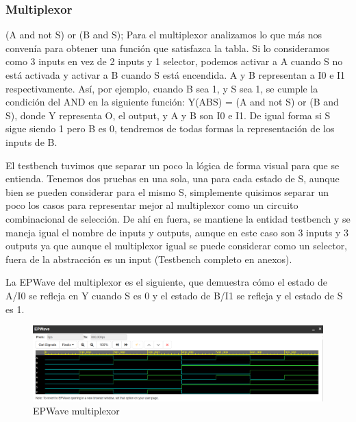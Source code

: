 \documentclass[12pt]{article}  %
\begin{document}
\subsubsection*{Multiplexor}
(A and not S) or (B and S);
Para el multiplexor analizamos lo que más nos convenía para obtener una función que satisfazca la tabla. Si lo consideramos como 3 inputs en vez de 2 inputs y 1 selector, podemos activar a A cuando S no está activada y activar a B cuando S está encendida. A y B representan a I0 e I1 respectivamente. Así, por ejemplo, cuando B sea 1, y S sea 1, se cumple la condición del AND en la siguiente función: Y(ABS) = (A and not S) or (B and S), donde Y representa O, el output, y A y B son I0 e I1. De igual forma si S sigue siendo 1 pero B es 0, tendremos de todas formas la representación de los inputs de B.



El testbench tuvimos que separar un poco la lógica de forma visual para que se entienda. Tenemos dos pruebas en una sola, una para cada estado de S, aunque bien se pueden considerar para el mismo S, simplemente quisimos separar un poco los casos para representar mejor al multiplexor como un circuito combinacional de selección. De ahí en fuera, se mantiene la entidad testbench y se maneja igual el nombre de inputs y outputs, aunque en este caso son 3 inputs y 3 outputs ya que aunque el multiplexor igual se puede considerar como un selector, fuera de la abstracción es un input (Testbench completo en anexos).



La EPWave del multiplexor es el siguiente, que demuestra cómo el estado de A/I0 se refleja en Y cuando S es 0 y el estado de B/I1 se refleja y el estado de S es 1.

\begin{figure}[!ht]
    \centering
    \caption{EPWave multiplexor}
    \includegraphics[width=1\linewidth]{Imagenes/waves/multiplexer.png}
\end{figure}
\end{document}
